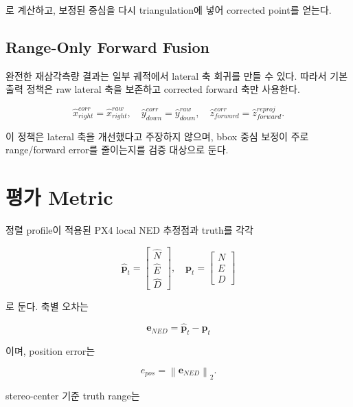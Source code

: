 \documentclass[10pt,conference]{IEEEtran}
\newcommand{\vect}[1]{\bm{#1}}
\newcommand{\norm}[1]{\left\lVert #1 \right\rVert_2}
\begin{document}
로 계산하고, 보정된 중심을 다시 triangulation에 넣어 corrected point를 얻는다.

\subsection{Range-Only Forward Fusion}

완전한 재삼각측량 결과는 일부 궤적에서 lateral 축 회귀를 만들 수 있다.
따라서 기본 출력 정책은 raw lateral 축을 보존하고 corrected forward 축만 사용한다.

\begin{equation}
\hat{x}_{right}^{corr}
=
\hat{x}_{right}^{raw},
\quad
\hat{y}_{down}^{corr}
=
\hat{y}_{down}^{raw},
\quad
\hat{z}_{forward}^{corr}
=
\hat{z}_{forward}^{reproj}.
\label{eq:range_only_forward}
\end{equation}

이 정책은 lateral 축을 개선했다고 주장하지 않으며, bbox 중심 보정이 주로 range/forward error를 줄이는지를 검증 대상으로 둔다.

\section{평가 Metric}

정렬 profile이 적용된 PX4 local NED 추정점과 truth를 각각

\begin{equation}
\hat{\vect{p}}_{t}
=
\begin{bmatrix}
\hat{N}\\\hat{E}\\\hat{D}
\end{bmatrix},
\quad
\vect{p}_{t}
=
\begin{bmatrix}
N\\E\\D
\end{bmatrix}
\end{equation}

로 둔다.
축별 오차는

\begin{equation}
\vect{e}_{NED}
=
\hat{\vect{p}}_{t}
-
\vect{p}_{t}
\end{equation}

이며, position error는

\begin{equation}
e_{pos}
=
\norm{\vect{e}_{NED}}.
\label{eq:position_error}
\end{equation}

stereo-center 기준 truth range는
\end{document}
